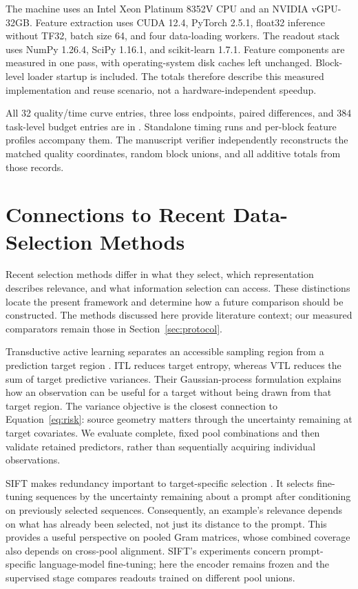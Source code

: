 The machine uses an Intel Xeon Platinum 8352V CPU and an NVIDIA vGPU-32GB. Feature extraction uses CUDA 12.4, PyTorch 2.5.1, float32 inference without TF32, batch size 64, and four data-loading workers. The readout stack uses NumPy 1.26.4, SciPy 1.16.1, and scikit-learn 1.7.1. Feature components are measured in one pass, with operating-system disk caches left unchanged. Block-level loader startup is included. The totals therefore describe this measured implementation and reuse scenario, not a hardware-independent speedup.

All 32 quality/time curve entries, three loss endpoints, paired differences, and 384 task-level budget entries are in . Standalone timing runs and per-block feature profiles accompany them. The manuscript verifier independently reconstructs the matched quality coordinates, random block unions, and all additive totals from those records.

\section{Connections to Recent Data-Selection Methods}
\label{app:related-selection}
Recent selection methods differ in what they select, which representation describes relevance, and what information selection can access. These distinctions locate the present framework and determine how a future comparison should be constructed. The methods discussed here provide literature context; our measured comparators remain those in Section~\ref{sec:protocol}.

Transductive active learning separates an accessible sampling region from a prediction target region \citep{hubotter2024transductive}. ITL reduces target entropy, whereas VTL reduces the sum of target predictive variances. Their Gaussian-process formulation explains how an observation can be useful for a target without being drawn from that target region. The variance objective is the closest connection to Equation~\eqref{eq:risk}: source geometry matters through the uncertainty remaining at target covariates. We evaluate complete, fixed pool combinations and then validate retained predictors, rather than sequentially acquiring individual observations.

SIFT makes redundancy important to target-specific selection \citep{hubotter2025sift}. It selects fine-tuning sequences by the uncertainty remaining about a prompt after conditioning on previously selected sequences. Consequently, an example's relevance depends on what has already been selected, not just its distance to the prompt. This provides a useful perspective on pooled Gram matrices, whose combined coverage also depends on cross-pool alignment. SIFT's experiments concern prompt-specific language-model fine-tuning; here the encoder remains frozen and the supervised stage compares readouts trained on different pool unions.

